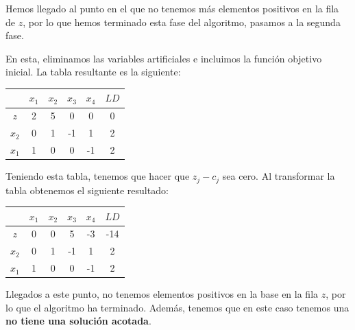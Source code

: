 \documentclass[11pt,table]{article}
\begin{document}
    Hemos llegado al punto en el que no tenemos más elementos positivos en la fila de \(z\), por lo que hemos terminado esta fase del algoritmo, pasamos a la segunda fase.

    En esta, eliminamos las variables artificiales e incluimos la función objetivo inicial. La tabla resultante es la siguiente:

    \begin{table}[H]
        \centering
        \begin{tabular}{c|cccc|c}
              & $x_1$ & $x_2$ & $x_3$ & $x_4$ & $LD$ \\ \hline
        $z$   & 2     & 5     & 0     & 0     & 0    \\
        $x_2$ & 0     & 1     & -1    & 1     & 2    \\
        $x_1$ & 1     & 0     & 0     & -1    & 2   
        \end{tabular}
    \end{table}

    Teniendo esta tabla, tenemos que hacer que \(z_j - c_j\) sea cero. Al transformar la tabla obtenemos el siguiente resultado:

    \begin{table}[H]
        \centering
        \begin{tabular}{c|cccc|c}
              & $x_1$ & $x_2$ & $x_3$ & $x_4$ & $LD$ \\ \hline
        $z$   & 0     & 0     & 5     & -3     & -14    \\
        $x_2$ & 0     & 1     & -1    & 1     & 2    \\
        $x_1$ & 1     & 0     & 0     & -1    & 2   
        \end{tabular}
    \end{table}

    Llegados a este punto, no tenemos elementos positivos en la base en la fila \(z\), por lo que el algoritmo ha terminado. Además, tenemos que en este caso tenemos una \textbf{no tiene una solución acotada}.\\
    
\end{document}
